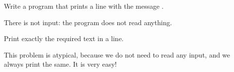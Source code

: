 
\Statement

Write a program that prints a line with the message .

\Input

There is not input: the program does not read anything.

\Output

Print exactly the required text in a line.

\Observation

This problem is atypical, because we do not need to read any input,
and we always print the same. It is very easy!

\Sample
